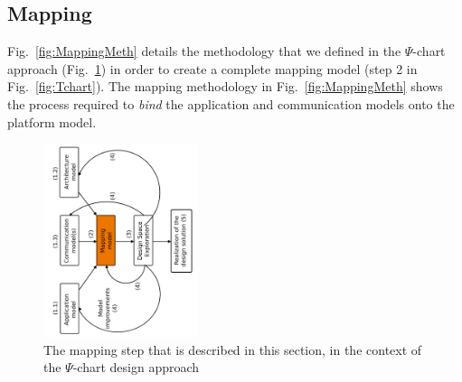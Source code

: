 \documentclass{llncs}
\begin{document}
\subsection{Mapping}
\label{subsec:Mapping}
%
Fig.~\ref{fig:MappingMeth} details the methodology that we defined in the $\Psi$-chart approach
(Fig.~\ref{fig:PsiChartMap}) in order to create a complete mapping model (step 2 in Fig.~\ref{fig:Tchart}). The mapping
methodology in Fig.~\ref{fig:MappingMeth} shows the process required to \textit{bind} the application and communication
models onto the platform model.
%
\begin{figure}[htbp]
	\centering
	\includegraphics[angle=-90,origin=c,width=0.4\textwidth]{figures/PsiChartMap.pdf}
	\caption{The mapping step that is described in this section, in the context of the $\Psi$-chart design approach}
	\label{fig:PsiChartMap}
\end{figure}
%
\end{document}
